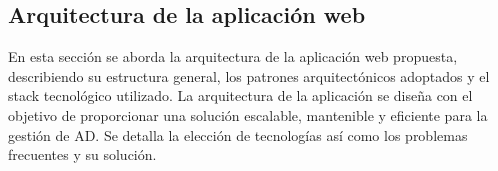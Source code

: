 \subsection{Arquitectura de la aplicación web}

En esta sección se aborda la arquitectura de la aplicación web propuesta, describiendo su estructura general, los patrones arquitectónicos adoptados y el stack tecnológico utilizado. La arquitectura de la aplicación se diseña con el objetivo de proporcionar una solución escalable, mantenible y eficiente para la gestión de AD. Se detalla la elección de tecnologías así como los problemas frecuentes y su solución.


